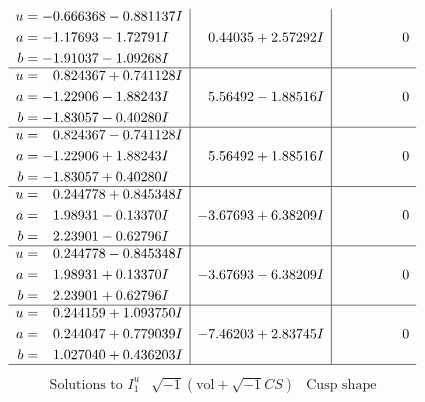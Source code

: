\documentclass[1p]{elsarticle_modified}
\theoremstyle{definition}
\newcommand{\I}{\sqrt{-1}}
\begin{document}
$$\begin{array}{c|c|c}
\begin{aligned}
u &= -0.666368 - 0.881137 I \\
a &= -1.17693 - 1.72791 I \\
b &= -1.91037 - 1.09268 I\end{aligned}
 & \phantom{-}0.44035 + 2.57292 I & \phantom{-0.000000 } 0 \\ \hline\begin{aligned}
u &= \phantom{-}0.824367 + 0.741128 I \\
a &= -1.22906 - 1.88243 I \\
b &= -1.83057 - 0.40280 I\end{aligned}
 & \phantom{-}5.56492 - 1.88516 I & \phantom{-0.000000 } 0 \\ \hline\begin{aligned}
u &= \phantom{-}0.824367 - 0.741128 I \\
a &= -1.22906 + 1.88243 I \\
b &= -1.83057 + 0.40280 I\end{aligned}
 & \phantom{-}5.56492 + 1.88516 I & \phantom{-0.000000 } 0 \\ \hline\begin{aligned}
u &= \phantom{-}0.244778 + 0.845348 I \\
a &= \phantom{-}1.98931 - 0.13370 I \\
b &= \phantom{-}2.23901 - 0.62796 I\end{aligned}
 & -3.67693 + 6.38209 I & \phantom{-0.000000 } 0 \\ \hline\begin{aligned}
u &= \phantom{-}0.244778 - 0.845348 I \\
a &= \phantom{-}1.98931 + 0.13370 I \\
b &= \phantom{-}2.23901 + 0.62796 I\end{aligned}
 & -3.67693 - 6.38209 I & \phantom{-0.000000 } 0 \\ \hline\begin{aligned}
u &= \phantom{-}0.244159 + 1.093750 I \\
a &= \phantom{-}0.244047 + 0.779039 I \\
b &= \phantom{-}1.027040 + 0.436203 I\end{aligned}
 & -7.46203 + 2.83745 I & \phantom{-0.000000 } 0\\
 \hline 
 \end{array}$$\newpage$$\begin{array}{c|c|c}  
\text{Solutions to }I^u_{1}& \I (\text{vol} + \sqrt{-1}CS) & \text{Cusp shape}\\
 \hline 
\begin{aligned}

\end{aligned}
\end{array}$$
\end{document}
